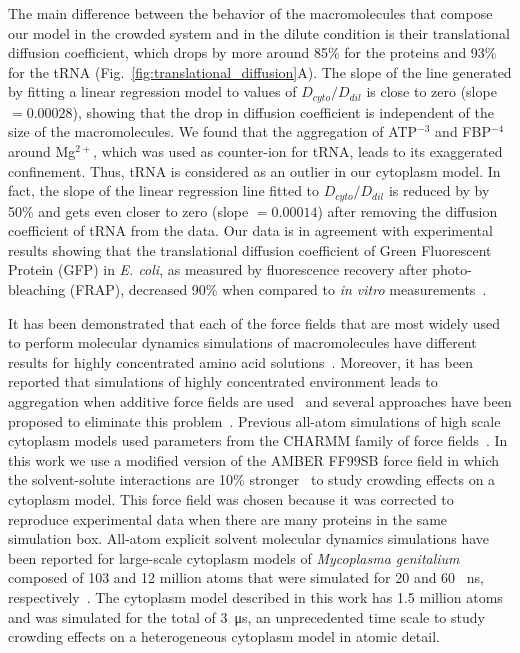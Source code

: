 \documentclass[journal=jacsat,manuscript=article]{achemso}
\begin{document}
The main difference between the behavior of the macromolecules that compose our model in the crowded system and in the dilute condition is their translational diffusion coefficient, which drops by more around 85\% for the proteins and 93\% for the tRNA (Fig.~\ref{fig:translational_diffusion}A). The slope of the line generated by fitting a linear regression model to values of $D_{cyto}/D_{dil}$ is close to zero (slope $= 0.00028$), showing that the drop in diffusion coefficient is independent of the size of the macromolecules. We found that the aggregation of ATP$^{-3}$ and FBP$^{-4}$ around Mg$^{2+}$, which was used as counter-ion for tRNA, leads to its exaggerated confinement. Thus, tRNA is considered as an outlier in our cytoplasm model. In fact, the slope of the linear regression line fitted to $D_{cyto}/D_{dil}$ is reduced by by 50\% and gets even closer to zero (slope $= 0.00014$) after removing the diffusion coefficient of tRNA from the data. Our data is in agreement with experimental results showing that the translational diffusion coefficient of Green Fluorescent Protein (GFP) in {\em E. coli}, as measured by fluorescence recovery after photo-bleaching (FRAP), decreased 90\% when compared to {\em in vitro} measurements~\cite{Elowitz1999,Konopka2006}.


It has been demonstrated that each of the force fields that are most widely used to perform molecular dynamics simulations of macromolecules have different results for highly concentrated amino acid solutions~\cite{andrews2013}. Moreover, it has been reported that simulations of highly concentrated environment leads to aggregation when additive force fields are used~\cite{Petrov2014a,Abriata2015a, Nawrocki2017a} and several approaches have been proposed to eliminate this problem~\cite{Best2014a,Piana2015a, Bashardanesh2018b}. Previous all-atom simulations of high scale cytoplasm models used parameters from the CHARMM family of force fields~\cite{Yu2016a}. In this work we use a modified version of the AMBER FF99SB force field in which the solvent-solute interactions are 10\% stronger~\cite{Best2014a} to study crowding effects on a cytoplasm model. This force field was chosen because it was corrected to reproduce experimental data when there are many proteins in the same simulation box. All-atom explicit solvent molecular dynamics simulations have been reported for large-scale cytoplasm models of \textit{Mycoplasma genitalium} composed of 103 and 12 million atoms that were simulated for 20 and 60 \SI{}{\nano\second}, respectively~\cite{Yu2016a}. The cytoplasm model described in this work has 1.5 million atoms and was simulated for the total of \SI{3}{\micro\second}, an unprecedented time scale to study crowding effects on a heterogeneous cytoplasm model in atomic detail.
\end{document}
